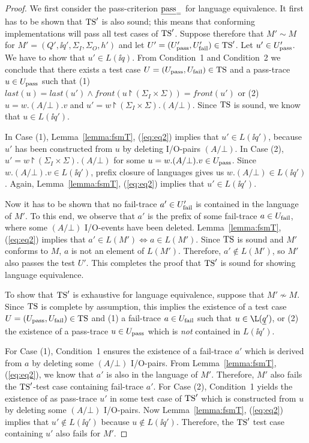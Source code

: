 \begin{proof}
We first consider the pass-criterion $\underline{\text{pass}}_=$ for language equivalence.
It first has to be shown that ${\text{TS}}'$ is also sound; this means that conforming 
implementations will pass all test cases of ${\text{TS}}'$. Suppose therefore that
$M' \sim M$ for  $M' = (Q',\ii q', \Sigma_I,\Sigma_O,h')$ and let $U' = ({U}_\text{pass}',{U}_\text{fail}')\in {\text{TS}}'$. Let $u'\in{U}_\text{pass}'$. We have to show that $u'\in L(\ii q)$. From Condition~1 and Condition~2 we conclude that
there exists a test case $U = ({U}_\text{pass},{U}_\text{fail})\in {\text{TS}}$ and a pass-trace
$u\in{U}_\text{pass}$ such that (1) 
$last(u) = last(u') \wedge front(u\project(\Sigma_I\times\Sigma)) = front(u')$ 
or (2) $u = w.(A/\bot).v$ and $u' = w\project(\Sigma_I\times\Sigma).(A/\bot)$.
Since ${\text{TS}}$ is sound, we know that $u\in L(\ii q')$.


In Case (1), Lemma~\ref{lemma:fsmT}, (\ref{eq:eq2}) implies that $u'\in L(\ii q')$,
because $u'$ has been constructed from $u$ by deleting  I/O-pairs $(A/\bot)$.
In Case (2), $u' = w\project(\Sigma_I\times\Sigma).(A/\bot)$ for some
$u = w.(A/\bot).v\in{U}_\text{pass}$. Since $w.(A/\bot).v\in L(\ii q')$, prefix closure of languages gives us $w.(A/\bot)\in L(\ii q')$. 
Again,  Lemma~\ref{lemma:fsmT}, (\ref{eq:eq2}) implies that $u'\in L(\ii q')$. 

Now it has to be shown that no fail-trace $a' \in {U}_\text{fail}'$ is contained in the language of $M'$. To this end, we observe that  $a'$ is the prefix of some fail-trace $a\in{U}_\text{fail}$, where some $(A/\bot)$ I/O-events have been deleted. 
Lemma~\ref{lemma:fsmT}, (\ref{eq:eq2}) implies that 
$a'\in L(M') \Leftrightarrow a \in L(M')$. Since ${\text{TS}}$ is sound and $M'$ conforms to $M$, $a$ is not an element of $L(M')$. Therefore, $a'\not\in L(M')$, so $M'$ also passes the test $U'$.
This
completes the proof that ${\text{TS}}'$ is sound for showing language equivalence.

To show that ${\text{TS}}'$ is exhaustive for language equivalence, suppose that $M'\not\sim M$.
Since ${\text{TS}}$ is complete by assumption, this implies  the existence of a 
test case $U = ({U}_\text{pass},{U}_\text{fail})\in{\text{TS}}$ and (1) a fail-trace $a\in{U}_\text{fail}$ such that
$u\in\L(\ii q')$, or (2) the existence of a pass-trace $u\in{U}_\text{pass}$ which is {\it not} contained in $L(\ii q')$.

For Case (1), Condition~1 ensures the existence of a fail-trace $a'$ which is derived 
from $a$ by deleting some $(A/\bot)$ I/O-pairs. From Lemma~\ref{lemma:fsmT}, (\ref{eq:eq2}), we know that $a'$ is also in the language of $M'$. Therefore, $M'$ 
also fails the ${\text{TS}}'$-test case containing fail-trace $a'$. For Case (2), 
Condition~1 yields the existence of as pass-trace $u'$ in some test case of ${\text{TS}}'$
which is constructed from $u$ by deleting some $(A/\bot)$ I/O-pairs. Now
Lemma~\ref{lemma:fsmT}, (\ref{eq:eq2}) implies that $u'\not\in L(\ii q')$ because
$u\not\in L(\ii q')$. Therefore, the ${\text{TS}}'$ test case containing $u'$ also fails for $M'$. 
 


\end{proof}

